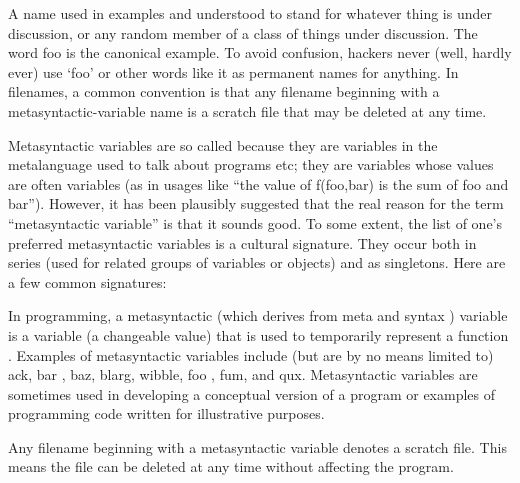 \documentclass[proposal.tex]{subfiles}
\begin{document}
\cite{webiste:metasyntacticvariablescatb}
A name used in examples and understood to stand for whatever thing is under discussion, or any random member of a class of things under discussion. The word foo is the canonical example. To avoid confusion, hackers never (well, hardly ever) use `foo'
or other words like it as permanent names for anything. In filenames, a common convention is that any filename beginning with a metasyntactic-variable name is a scratch file that may be deleted at any time.

Metasyntactic variables are so called because they are variables in the metalanguage used to talk about programs
etc; they are variables whose values are often variables (as in usages like ``the value of f(foo,bar) is
the sum of foo and bar'').
However, it has been plausibly suggested that the real reason for the term ``metasyntactic
variable'' is that it sounds good.
To some extent, the list of one's preferred metasyntactic variables is a cultural signature.
They occur both in series (used for related groups of variables or objects) and as singletons.
Here are a few common signatures:


\cite{webiste:metasyntacticvariableswhatistectarget}
In programming, a metasyntactic (which derives from meta and syntax ) variable is a variable (a changeable value) that is used to temporarily represent a function . Examples of metasyntactic variables include (but are by no means limited to) ack, bar , baz, blarg, wibble, foo , fum, and qux. Metasyntactic variables are sometimes used in developing a conceptual version of a program or examples of programming code written for illustrative purposes.

Any filename beginning with a metasyntactic variable denotes a scratch file. This means the file can be deleted at any time without affecting the program.
\end{document}

